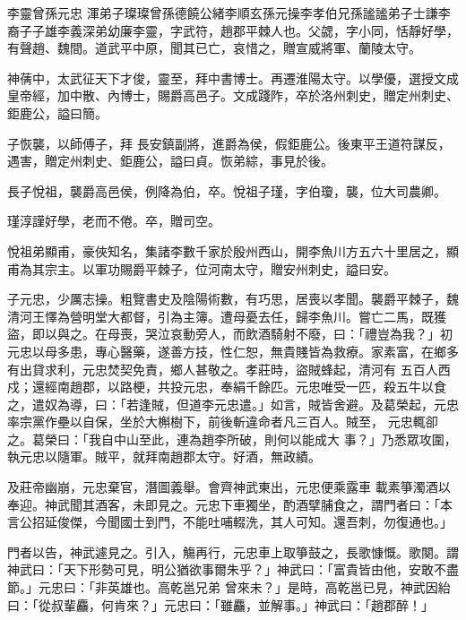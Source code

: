 
\begin{pinyinscope}

 李靈曾孫元忠
 渾弟子璨璨曾孫德饒公緒李順玄孫元操李孝伯兄孫謐謐弟子士謙李裔子子雄李義深弟幼廉李靈，字武符，趙郡平棘人也。父勰，字小同，恬靜好學，有聲趙、魏間。道武平中原，聞其已亡，哀惜之，贈宣威將軍、蘭陵太守。



 神蒨中，太武征天下才俊，靈至，拜中書博士。再遷淮陽太守。以學優，選授文成皇帝經，加中散、內博士，賜爵高邑子。文成踐阼，卒於洛州刺史，贈定州刺史、鉅鹿公，謚曰簡。



 子恢襲，以師傅子，拜
 長安鎮副將，進爵為侯，假鉅鹿公。後東平王道符謀反，遇害，贈定州刺史、鉅鹿公，謚曰貞。恢弟綜，事見於後。



 長子悅祖，襲爵高邑侯，例降為伯，卒。悅祖子瑾，字伯瓊，襲，位大司農卿。



 瑾淳謹好學，老而不倦。卒，贈司空。



 悅祖弟顯甫，豪俠知名，集諸李數千家於殷州西山，開李魚川方五六十里居之，顯甫為其宗主。以軍功賜爵平棘子，位河南太守，贈安州刺史，謚曰安。



 子元忠，少厲志操。粗覽書史及陰陽術數，有巧思，居喪以孝聞。襲爵平棘子，魏清河王懌為營明堂大都督，引為主簿。遭母憂去任，歸李魚川。嘗亡二馬，既獲盜，即以與之。在母喪，哭泣哀動旁人，而飲酒騎射不廢，曰：「禮豈為我？」初元忠以母多患，專心醫藥，遂善方技，性仁恕，無貴賤皆為救療。家素富，在鄉多有出貸求利，元忠焚契免責，鄉人甚敬之。孝莊時，盜賊蜂起，清河有
 五百人西戍；還經南趙郡，以路梗，共投元忠，奉絹千餘匹。元忠唯受一匹，殺五牛以食之，遣奴為導，曰：「若逢賊，但道李元忠遣。」如言，賊皆舍避。及葛榮起，元忠率宗黨作壘以自保，坐於大槲樹下，前後斬違命者凡三百人。賊至，
 元忠輒卻之。葛榮曰：「我自中山至此，連為趙李所破，則何以能成大
 事？」乃悉眾攻圍，執元忠以隨軍。賊平，就拜南趙郡太守。好酒，無政績。



 及莊帝幽崩，元忠棄官，潛圖義舉。會齊神武東出，元忠便乘露車
 載素箏濁酒以奉迎。神武聞其酒客，未即見之。元忠下車獨坐，酌酒擘脯食之，謂門者曰：「本言公招延俊傑，今聞國士到門，不能吐哺輟洗，其人可知。還吾刺，勿復通也。」



 門者以告，神武遽見之。引入，觴再行，元忠車上取箏鼓之，長歌慷慨。歌闋。謂神武曰：「天下形勢可見，明公猶欲事爾朱乎？」神武曰：「富貴皆由他，安敢不盡節。」元忠曰：「非英雄也。高乾邕兄弟
 曾來未？」是時，高乾邕已見，神武因紿曰：「從叔輩麤，何肯來？」元忠曰：「雖麤，並解事。」神武曰：「趙郡醉！」




\end{pinyinscope}
